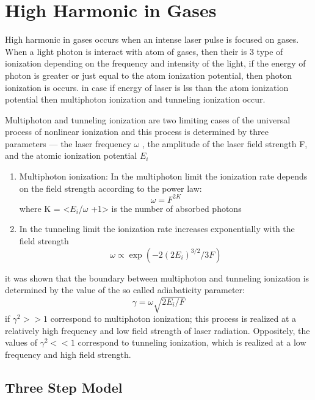\hypertarget{high-harmonic-in-gases}{%
\section{High Harmonic in Gases}\label{high-harmonic-in-gases}}

High harmonic in gases occurs when an intense laser pulse is focused on
gases. When a light photon is interact with atom of gases, then their is
3 type of ionization depending on the frequency and intensity of the
light, if the energy of photon is greater or just equal to the atom
ionization potential, then photon ionization is occurs. in case if
energy of laser is lss than the atom ionization potential then
multiphoton ionization and tunneling ionization occur.

Multiphoton and tunneling ionization are two limiting cases of the
universal process of nonlinear ionization and this process is determined
by three parameters --- the laser frequency \(\omega\) , the amplitude
of the laser field strength F, and the atomic ionization potential
\(E_i\)

\begin{enumerate}
\def\labelenumi{\arabic{enumi}.}
\item
  Multiphoton ionization: In the multiphoton limit the ionization rate
  depends on the field strength according to the power law:
  \[\omega = F^{2K}\] where K = \textless{}\(E_i\)/\(\omega\)
  +1\textgreater{} is the number of absorbed photons
\item
  In the tunneling limit the ionization rate increases exponentially
  with the field strength \[\omega \propto  \exp(-2(2E_i)^{3/2}/3F)\]
\end{enumerate}

it was shown that the boundary between multiphoton and tunneling
ionization is determined by the value of the so called adiabaticity
parameter: \[ \gamma =\omega \sqrt{2E_i/F}\] if \(\gamma^{2}>>1\)
correspond to multiphoton ionization; this process is realized at a
relatively high frequency and low field strength of laser radiation.
Oppositely, the values of \(\gamma^{2}<<1\) correspond to tunneling
ionization, which is realized at a low frequency and high field
strength.

\hypertarget{three-step-model}{%
\subsection{Three Step Model}\label{three-step-model}}

